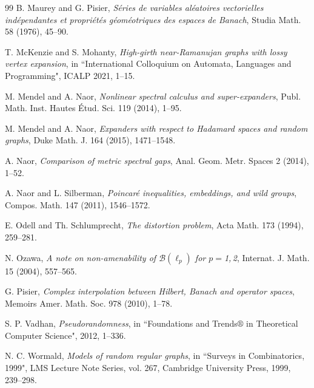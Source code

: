 \documentclass[11pt,leqno]{amsart}
\theoremstyle{remark}
\theoremstyle{plain}
\begin{document}
\begin{thebibliography}{99}
 B. Maurey and G. Pisier,
\emph{S\'{e}ries de variables al\'{e}atoires vectorielles ind\'{e}pendantes et
propri\'{e}t\'{e}s g\'{e}om\'{e}otriques des espaces de Banach},
Studia Math. 58 (1976), 45--90.

 T. McKenzie and S. Mohanty,
\emph{High-girth near-{R}amanujan graphs with lossy vertex expansion},
in ``International Colloquium on Automata, Languages and Programming"\!, ICALP 2021, 1--15.

 M. Mendel and A. Naor,
\emph{Nonlinear spectral calculus and super-expanders},
Publ. Math. Inst. Hautes \'{E}tud. Sci. 119 (2014), 1--95.

 M. Mendel and A. Naor,
\emph{Expanders with respect to Hadamard spaces and random graphs},
Duke Math. J. 164 (2015), 1471--1548.

 A. Naor,
\emph{Comparison of metric spectral gaps},
Anal. Geom. Metr. Spaces 2 (2014), 1--52.

 A. Naor and L. Silberman,
\emph{Poincar\'{e} inequalities, embeddings, and wild groups},
Compos. Math. 147 (2011), 1546--1572.

 E. Odell and Th. Schlumprecht,
\emph{The distortion problem},
Acta Math. 173 (1994), 259--281.

 N. Ozawa,
\emph{A note on non-amenability of $\mathcal{B}(\ell_p)$ for $p=$1,\,2},
Internat. J. Math. 15 (2004), 557--565.

 G. Pisier,
\emph{Complex interpolation between Hilbert, Banach and operator spaces},
Memoirs Amer. Math. Soc. 978 (2010), 1--78.

 S. P. Vadhan,
\emph{Pseudorandomness},
in ``Foundations and Trends$\circledR$ in Theoretical Computer Science"\!, 2012, 1--336.

  N. C. Wormald,
\emph{Models of random regular graphs},
in ``Surveys in Combinatorics, 1999"\!, LMS Lecture Note Series, vol. 267, Cambridge University Press, 1999, 239--298.

\end{thebibliography}
\end{document}
